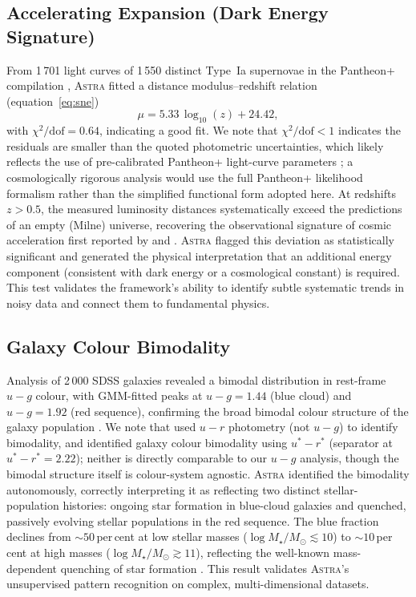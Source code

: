 \documentclass[usenatbib]{rasti}
\newcommand{\astra}{\textsc{Astra}\xspace}
\begin{document}
\subsection{Accelerating Expansion (Dark Energy Signature)}
\label{sec:live:sne}

From 1\,701 light curves of 1\,550 distinct Type~Ia supernovae in the Pantheon+ compilation \citep{Brout2022}, \astra fitted a distance modulus--redshift relation (equation~\ref{eq:sne})
\begin{equation}
  \mu = 5.33\,\log_{10}(z) + 24.42,
  \label{eq:sne}
\end{equation}
with $\chi^{2}/\mathrm{dof} = 0.64$, indicating a good fit. We note that $\chi^{2}/\mathrm{dof} < 1$ indicates the residuals are smaller than the quoted photometric uncertainties, which likely reflects the use of pre-calibrated Pantheon+ light-curve parameters \citep{Brout2022}; a cosmologically rigorous analysis would use the full Pantheon+ likelihood formalism rather than the simplified functional form adopted here.
At redshifts $z > 0.5$, the measured luminosity distances systematically exceed the predictions of an empty (Milne) universe, recovering the observational signature of cosmic acceleration first reported by \citet{Riess1998} and \citet{Perlmutter1999}.
\astra flagged this deviation as statistically significant and generated the physical interpretation that an additional energy component (consistent with dark energy or a cosmological constant) is required.
This test validates the framework's ability to identify subtle systematic trends in noisy data and connect them to fundamental physics.

\subsection{Galaxy Colour Bimodality}
\label{sec:live:bimodality}

Analysis of 2\,000 SDSS galaxies revealed a bimodal distribution in rest-frame $u{-}g$ colour, with GMM-fitted peaks at $u{-}g = 1.44$ (blue cloud) and $u{-}g = 1.92$ (red sequence), confirming the broad bimodal colour structure of the galaxy population \citep{Baldry2004}. We note that \citet{Baldry2004} used $u{-}r$ photometry (not $u{-}g$) to identify bimodality, and \citet{Strateva2001} identified galaxy colour bimodality using $u^{*}{-}r^{*}$ (separator at $u^{*}{-}r^{*} = 2.22$); neither is directly comparable to our $u{-}g$ analysis, though the bimodal structure itself is colour-system agnostic.
\astra identified the bimodality autonomously, correctly interpreting it as reflecting two distinct stellar-population histories: ongoing star formation in blue-cloud galaxies and quenched, passively evolving stellar populations in the red sequence.
The blue fraction declines from ${\sim}50$\,per\,cent at low stellar masses ($\log M_{\star}/M_{\odot} \lesssim 10$) to ${\sim}10$\,per\,cent at high masses ($\log M_{\star}/M_{\odot} \gtrsim 11$), reflecting the well-known mass-dependent quenching of star formation \citep{Peng2010}.
This result validates \astra's unsupervised pattern recognition on complex, multi-dimensional datasets.
\end{document}
